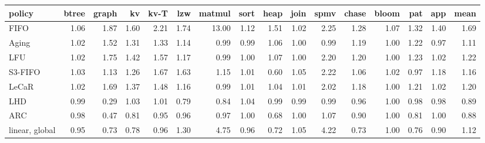 \begin{tabular}{lrrrrrrrrrrrrrrr}
\toprule
policy & btree & graph & kv & kv-T & lzw & matmul & sort & heap & join & spmv & chase & bloom & pat & app & mean \\
\midrule
FIFO & 1.06 & 1.87 & 1.60 & 2.21 & 1.74 & 13.00 & 1.12 & 1.51 & 1.02 & 2.25 & 1.28 & 1.07 & 1.32 & 1.40 & 1.69 \\
Aging & 1.02 & 1.52 & 1.31 & 1.33 & 1.14 & 0.99 & 0.99 & 1.06 & 1.00 & 0.99 & 1.19 & 1.00 & 1.22 & 0.97 & 1.11 \\
LFU & 1.02 & 1.75 & 1.42 & 1.57 & 1.17 & 0.99 & 1.00 & 1.07 & 1.00 & 2.20 & 1.20 & 1.00 & 1.23 & 1.02 & 1.22 \\
S3-FIFO & 1.03 & 1.13 & 1.26 & 1.67 & 1.63 & 1.15 & 1.01 & 0.60 & 1.05 & 2.22 & 1.06 & 1.02 & 0.97 & 1.18 & 1.16 \\
LeCaR & 1.02 & 1.69 & 1.37 & 1.48 & 1.16 & 0.99 & 1.01 & 1.04 & 1.01 & 2.02 & 1.18 & 1.00 & 1.21 & 1.02 & 1.20 \\
LHD & 0.99 & 0.29 & 1.03 & 1.01 & 0.79 & 0.84 & 1.04 & 0.99 & 0.99 & 0.99 & 0.96 & 1.00 & 0.98 & 0.98 & 0.89 \\
ARC & 0.98 & 0.47 & 0.81 & 0.95 & 0.96 & 0.97 & 1.00 & 0.68 & 1.00 & 1.07 & 0.90 & 1.00 & 0.81 & 1.00 & 0.88 \\
linear, global & 0.95 & 0.73 & 0.78 & 0.96 & 1.30 & 4.75 & 0.96 & 0.72 & 1.05 & 4.22 & 0.73 & 1.00 & 0.76 & 0.90 & 1.12 \\
\bottomrule
\end{tabular}
